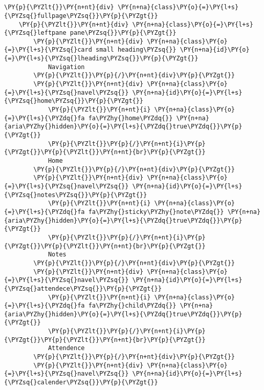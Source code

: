 \section*{}

\begin{Verbatim}[commandchars=\\\{\}]
\PY{p}{\PYZlt{}}\PY{n+nt}{div} \PY{n+na}{class}\PY{o}{=}\PY{l+s}{\PYZsq{}fullpage\PYZsq{}}\PY{p}{\PYZgt{}}
    \PY{p}{\PYZlt{}}\PY{n+nt}{div} \PY{n+na}{class}\PY{o}{=}\PY{l+s}{\PYZsq{}leftpane pane\PYZsq{}}\PY{p}{\PYZgt{}}
        \PY{p}{\PYZlt{}}\PY{n+nt}{div} \PY{n+na}{class}\PY{o}{=}\PY{l+s}{\PYZsq{}card small heading\PYZsq{}} \PY{n+na}{id}\PY{o}{=}\PY{l+s}{\PYZsq{}lheading\PYZsq{}}\PY{p}{\PYZgt{}}
            Navigation
        \PY{p}{\PYZlt{}}\PY{p}{/}\PY{n+nt}{div}\PY{p}{\PYZgt{}}
        \PY{p}{\PYZlt{}}\PY{n+nt}{div} \PY{n+na}{class}\PY{o}{=}\PY{l+s}{\PYZsq{}navel\PYZsq{}} \PY{n+na}{id}\PY{o}{=}\PY{l+s}{\PYZsq{}home\PYZsq{}}\PY{p}{\PYZgt{}}
            \PY{p}{\PYZlt{}}\PY{n+nt}{i} \PY{n+na}{class}\PY{o}{=}\PY{l+s}{\PYZdq{}fa fa\PYZhy{}home\PYZdq{}} \PY{n+na}{aria\PYZhy{}hidden}\PY{o}{=}\PY{l+s}{\PYZdq{}true\PYZdq{}}\PY{p}{\PYZgt{}}
            \PY{p}{\PYZlt{}}\PY{p}{/}\PY{n+nt}{i}\PY{p}{\PYZgt{}}\PY{p}{\PYZlt{}}\PY{n+nt}{br}\PY{p}{\PYZgt{}}
            Home
        \PY{p}{\PYZlt{}}\PY{p}{/}\PY{n+nt}{div}\PY{p}{\PYZgt{}}
        \PY{p}{\PYZlt{}}\PY{n+nt}{div} \PY{n+na}{class}\PY{o}{=}\PY{l+s}{\PYZsq{}navel\PYZsq{}} \PY{n+na}{id}\PY{o}{=}\PY{l+s}{\PYZsq{}notes\PYZsq{}}\PY{p}{\PYZgt{}}
            \PY{p}{\PYZlt{}}\PY{n+nt}{i} \PY{n+na}{class}\PY{o}{=}\PY{l+s}{\PYZdq{}fa fa\PYZhy{}sticky\PYZhy{}note\PYZdq{}} \PY{n+na}{aria\PYZhy{}hidden}\PY{o}{=}\PY{l+s}{\PYZdq{}true\PYZdq{}}\PY{p}{\PYZgt{}}
            \PY{p}{\PYZlt{}}\PY{p}{/}\PY{n+nt}{i}\PY{p}{\PYZgt{}}\PY{p}{\PYZlt{}}\PY{n+nt}{br}\PY{p}{\PYZgt{}}
            Notes
        \PY{p}{\PYZlt{}}\PY{p}{/}\PY{n+nt}{div}\PY{p}{\PYZgt{}}
        \PY{p}{\PYZlt{}}\PY{n+nt}{div} \PY{n+na}{class}\PY{o}{=}\PY{l+s}{\PYZsq{}navel\PYZsq{}} \PY{n+na}{id}\PY{o}{=}\PY{l+s}{\PYZsq{}attendece\PYZsq{}}\PY{p}{\PYZgt{}}
            \PY{p}{\PYZlt{}}\PY{n+nt}{i} \PY{n+na}{class}\PY{o}{=}\PY{l+s}{\PYZdq{}fa fa\PYZhy{}child\PYZdq{}} \PY{n+na}{aria\PYZhy{}hidden}\PY{o}{=}\PY{l+s}{\PYZdq{}true\PYZdq{}}\PY{p}{\PYZgt{}}
            \PY{p}{\PYZlt{}}\PY{p}{/}\PY{n+nt}{i}\PY{p}{\PYZgt{}}\PY{p}{\PYZlt{}}\PY{n+nt}{br}\PY{p}{\PYZgt{}}
            Attendence
        \PY{p}{\PYZlt{}}\PY{p}{/}\PY{n+nt}{div}\PY{p}{\PYZgt{}}
        \PY{p}{\PYZlt{}}\PY{n+nt}{div} \PY{n+na}{class}\PY{o}{=}\PY{l+s}{\PYZsq{}navel\PYZsq{}} \PY{n+na}{id}\PY{o}{=}\PY{l+s}{\PYZsq{}calender\PYZsq{}}\PY{p}{\PYZgt{}}

\end{Verbatim}
